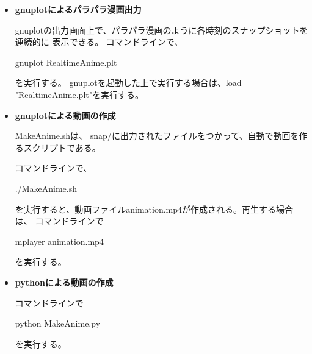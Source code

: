 {\begin{itemize}
    \begin{screen}
    {\ttfamily gnuplot> plot "snap/t00001.dat" using 1:2}
    \end{screen}
　　と入力すると横軸を1列目、縦軸を2列目にとったグラフが出力される。

    解析解と同時に出力したい場合は、
    \begin{screen}
    \small
    {\ttfamily gnuplot> plot "snap/t00001.dat" using 1:2 w lp, "sod\_ana.dat" using 1:2 w l}
    \end{screen}

    {\ttfamily using}の後の列を指定する箇所は、演算した結果を使うこともできる。\\
    たとえば、
    {\ttfamily using (\$1*2):(\$2*\$3)}にすると、1列目を2倍した値を横軸とし、
    2列目と3列目の積の値を縦軸にとったプロットを作れる。


    \item {\bf {\ttfamily gnuplot}によるパラパラ漫画出力}

    {\ttfamily gnuplot}の出力画面上で、パラパラ漫画のように各時刻のスナップショットを連続的に
    表示できる。
    コマンドラインで、
    \begin{screen}
    \small
    {\ttfamily gnuplot RealtimeAnime.plt}
    \end{screen}
    を実行する。
    {\ttfamily gnuplot}を起動した上で実行する場合は、{\ttfamily load "RealtimeAnime.plt"}を実行する。
    
    \item {\bf {\ttfamily gnuplot}による動画の作成}

    {\ttfamily MakeAnime.sh}は、
    {\ttfamily snap/}に出力されたファイルをつかって、自動で動画を作るスクリプトである。

    コマンドラインで、
    \begin{screen}
    \small
    {\ttfamily ./MakeAnime.sh}
    \end{screen}
    を実行すると、動画ファイル{\ttfamily animation.mp4}が作成される。再生する場合は、
    コマンドラインで
    \begin{screen}
    \small
    {\ttfamily mplayer animation.mp4}
    \end{screen}
    を実行する。
    
    
    \item {\bf {\ttfamily python}による動画の作成}

    コマンドラインで
    \begin{screen}
    \small
    {\ttfamily python MakeAnime.py}
    \end{screen}
    を実行する。
    

\end{itemize}}

